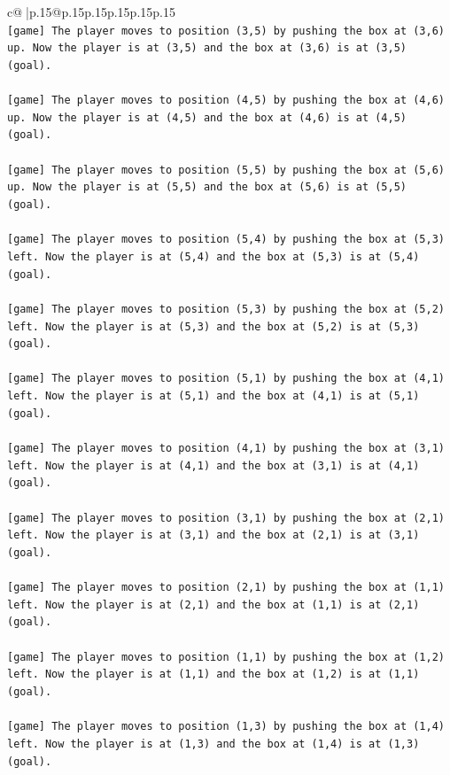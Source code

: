 \documentclass{article}
\begin{document}
{\begin{supertabular}{c@{$\;$}|p{.15\linewidth}@{}p{.15\linewidth}p{.15\linewidth}p{.15\linewidth}p{.15\linewidth}p{.15\linewidth}}
{{{\\ 
\texttt{{[}game{]} The player moves to position (3,5) by pushing the box at (3,6) up. Now the player is at (3,5) and the box at (3,6) is at (3,5) (goal).} \\
\\ 
\texttt{{[}game{]} The player moves to position (4,5) by pushing the box at (4,6) up. Now the player is at (4,5) and the box at (4,6) is at (4,5) (goal).} \\
\\ 
\texttt{{[}game{]} The player moves to position (5,5) by pushing the box at (5,6) up. Now the player is at (5,5) and the box at (5,6) is at (5,5) (goal).} \\
\\ 
\texttt{{[}game{]} The player moves to position (5,4) by pushing the box at (5,3) left. Now the player is at (5,4) and the box at (5,3) is at (5,4) (goal).} \\
\\ 
\texttt{{[}game{]} The player moves to position (5,3) by pushing the box at (5,2) left. Now the player is at (5,3) and the box at (5,2) is at (5,3) (goal).} \\
\\ 
\texttt{{[}game{]} The player moves to position (5,1) by pushing the box at (4,1) left. Now the player is at (5,1) and the box at (4,1) is at (5,1) (goal).} \\
\\ 
\texttt{{[}game{]} The player moves to position (4,1) by pushing the box at (3,1) left. Now the player is at (4,1) and the box at (3,1) is at (4,1) (goal).} \\
\\ 
\texttt{{[}game{]} The player moves to position (3,1) by pushing the box at (2,1) left. Now the player is at (3,1) and the box at (2,1) is at (3,1) (goal).} \\
\\ 
\texttt{{[}game{]} The player moves to position (2,1) by pushing the box at (1,1) left. Now the player is at (2,1) and the box at (1,1) is at (2,1) (goal).} \\
\\ 
\texttt{{[}game{]} The player moves to position (1,1) by pushing the box at (1,2) left. Now the player is at (1,1) and the box at (1,2) is at (1,1) (goal).} \\
\\ 
\texttt{{[}game{]} The player moves to position (1,3) by pushing the box at (1,4) left. Now the player is at (1,3) and the box at (1,4) is at (1,3) (goal).} \\
}}}
\end{supertabular}}
\end{document}
